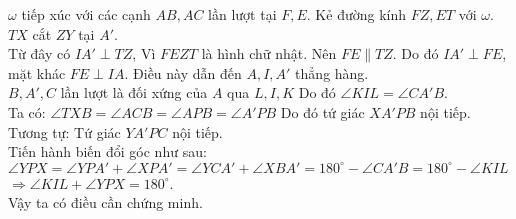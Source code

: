 \documentclass[12pt,a4paper]{article}
\begin{document}
$\omega$ tiếp xúc với các cạnh $AB,AC$ lần lượt tại $F,E$. Kẻ đường kính $FZ, ET$ với $\omega$. $TX$ cắt $ZY$ tại $A'$.\\

Từ đây có $IA'\perp TZ$, Vì $FEZT$ là hình chữ nhật. Nên $FE\parallel TZ$. Do đó $IA'\perp FE$, mặt khác $FE\perp IA$. Điều này dẫn đến $A,I,A'$ thẳng hàng.\\

$B,A',C$ lần lượt là đối xứng của $A$ qua $L,I,K$ Do đó $\angle KIL=\angle CA'B$.\\

Ta có: $\angle TXB=\angle ACB=\angle APB=\angle A'PB$ Do đó tứ giác $XA'PB$ nội tiếp. Tương tự: Tứ giác $YA'PC$ nội tiếp.\\

Tiến hành biến đổi góc như sau:\\
$\angle YPX=\angle YPA'+\angle XPA'=\angle YCA'+\angle XBA'=180^{\circ}-\angle CA'B=180^{\circ}-\angle KIL$\\
$\Rightarrow \angle KIL+\angle YPX=180^{\circ}$.\\

Vậy ta có điều cần chứng minh.
\end{document}
